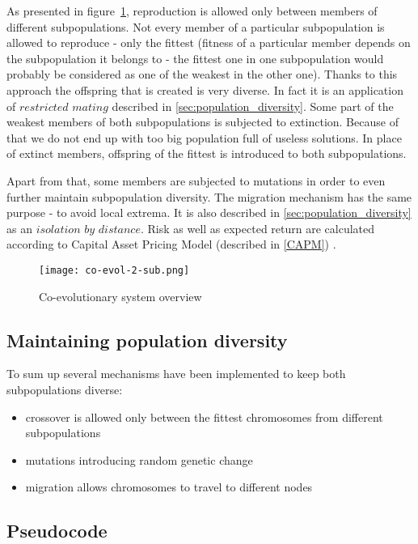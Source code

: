 As presented in figure~\ref{fig:co-evol}, reproduction is allowed only between members of different subpopulations.
Not every member of a particular subpopulation is allowed to reproduce - only the fittest (fitness of a particular member depends on the subpopulation it belongs to - the fittest one
 in one subpopulation would probably be considered as one of the weakest in the other one).
Thanks to this approach the offspring that is created is very diverse.
In fact it is an application of $restricted$ $mating$ described in \ref{sec:population_diversity}. 
Some part of the weakest members of both subpopulations is subjected to extinction.
Because of that we do not end up with too big population full of useless solutions.
In place of extinct members, offspring of the fittest is introduced to both subpopulations.

Apart from that, some members are subjected to mutations in order to even further maintain subpopulation diversity.
The migration mechanism has the same purpose - to avoid local extrema.
It is also described in \ref{sec:population_diversity} as an $isolation$ $by$ $distance$.
Risk as well as expected return are calculated according to Capital Asset Pricing Model (described in \ref{CAPM}) .
 

\begin{figure}[ht]  
	    \begin{center}
	      \texttt{[image: co-evol-2-sub.png]}
	    \end{center}
	    \caption{Co-evolutionary system overview} 
	    \label{fig:co-evol}
	  \end{figure}

\subsection{Maintaining population diversity}

To sum up several mechanisms have been implemented to keep both subpopulations diverse:

\begin{itemize}
  \item crossover is allowed only between the fittest chromosomes from different subpopulations 
  \item mutations introducing random genetic change
  \item migration allows chromosomes to travel to different nodes  
\end{itemize}

\subsection{Pseudocode}

